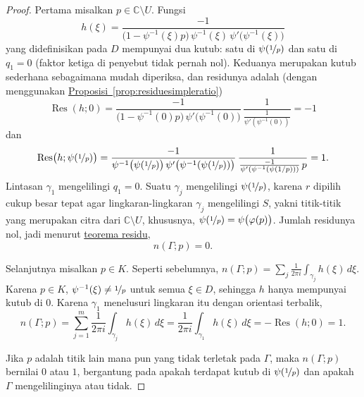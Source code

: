 \documentclass[12pt,openany]{book}
\newcommand{\C}{{\mathbb{C}}}
\theoremstyle{plain}
\theoremstyle{remark}
\theoremstyle{definition}
\theoremstyle{exercise}
\theoremstyle{example}
\newcommand{\propref}[1]{\hyperref[#1]{Proposisi~\ref*{#1}}}
\begin{document}
\begin{proof}
Pertama misalkan $p \in \C \setminus U$.
Fungsi
\begin{equation*}
h(\xi) =
\frac{-1}{ \bigl( 1-\psi^{-1}(\xi)p \bigr)
\,
\psi^{-1}(\xi)
\,
\psi' \bigl(\psi^{-1}(\xi)\bigr)}
\end{equation*}
yang didefinisikan pada $D$ mempunyai dua kutub: satu di $\psi(\nicefrac{1}{p})$ dan satu
di $q_1=0$ (faktor ketiga di penyebut tidak pernah nol).
Keduanya merupakan kutub sederhana sebagaimana mudah diperiksa, dan residunya adalah (dengan menggunakan
\propref{prop:residuesimpleratio})
\begin{equation*}
\operatorname{Res}(h;0) =
\frac{-1}{ \bigl( 1-\psi^{-1}(0)p \bigr)
\,
\psi' \bigl(\psi^{-1}(0)\bigr)}
\,
\frac{1}{\frac{1}{\psi'(\psi^{-1}(0))}}
=
-1
\end{equation*}
dan
\begin{equation*}
\operatorname{Res}\bigl(h;\psi(\nicefrac{1}{p})\bigr)
=
\frac{-1}{
\psi^{-1}\bigl(\psi(\nicefrac{1}{p})\bigr)
\,
\psi' \bigl(\psi^{-1}(\psi(\nicefrac{1}{p}))\bigr)
}
\,
\frac{1}{
\frac{-1}{\psi'(\psi^{-1}(\psi(1/p)))}
\, p
}
=
1 .
\end{equation*}
Lintasan $\gamma_1$ mengelilingi $q_1=0$.
Suatu $\gamma_j$ mengelilingi
$\psi(\nicefrac{1}{p})$, karena $r$ dipilih cukup besar
tepat agar lingkaran-lingkaran $\gamma_j$ mengelilingi $S$, yakni titik-titik yang
merupakan citra dari $\C \setminus U$,
khususnya, $\psi(\nicefrac{1}{p})=\psi\bigl(\varphi(p)\bigr)$.
Jumlah residunya nol, jadi
menurut \hyperref[thm:residue]{teorema residu},
\begin{equation*}
n(\Gamma;p) = 0 .
\end{equation*}

Selanjutnya misalkan $p \in K$. Seperti sebelumnya,
$n(\Gamma;p) =
\sum_j
\frac{1}{2\pi i}
\int_{\gamma_j} h(\xi) \, d\xi$.
Karena $p \in K$, $\psi^{-1}(\xi) \neq \nicefrac{1}{p}$ untuk semua $\xi \in D$,
sehingga $h$ hanya mempunyai kutub di $0$.
Karena $\gamma_1$ menelusuri lingkaran itu dengan orientasi terbalik,
\begin{equation*}
n(\Gamma;p) =
\sum_{j=1}^m
\frac{1}{2\pi i}
\int_{\gamma_j} h(\xi) \, d\xi
=
\frac{1}{2\pi i}
\int_{\gamma_1} h(\xi) \, d\xi
= - \operatorname{Res}(h;0) = 1 .
\end{equation*}

Jika $p$ adalah titik lain mana pun yang tidak terletak pada $\Gamma$, maka $n(\Gamma;p)$
bernilai $0$ atau $1$, bergantung pada apakah terdapat kutub di
$\psi(\nicefrac{1}{p})$ dan apakah $\Gamma$ mengelilinginya atau tidak.
\end{proof}
\end{document}

